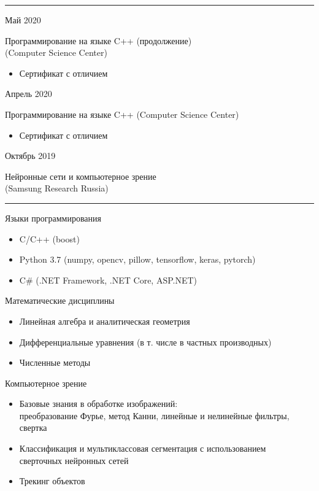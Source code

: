 \documentclass[a4paper,10pt]{article}
\newlength{\cvcolumngapwidth}
\newlength{\cvleftcolumnwidth}
\newlength{\cvrightcolumnwidth}
\newcommand{\cvsectionstyle}[1]{{\normalsize\cvsectionfont\textcolor{cvsectioncolor}{#1}}}
\newcommand{\cvtitlestyle}[1]{{\large\cvtitlefont\textcolor{cvtitlecolor}{#1}}}
\newcommand{\cvdurationstyle}[1]{{\small\cvdurationfont\textcolor{cvdurationcolor}{#1}}}
\newcommand{\cvheadingstyle}[1]{{\normalsize\cvheadingfont\textcolor{cvheadingcolor}{#1}}}
\newlength{\cvafteritemskipamount}
\newlength{\cvaftersectionskipamount}
\newlength{\cvbetweensectionandheadingextraskipamount}
\newlength{\cvaftertitleskipamount}
\newlength{\cvparskip}
\newcommand{\cvsection}[1]{
    \begin{minipage}[t]{\cvleftcolumnwidth}
        \raggedleft\cvsectionstyle{#1}
    \end{minipage}%
    \hspace{\cvcolumngapwidth}%
    \begin{minipage}[t]{\cvrightcolumnwidth}
        \textcolor{cvrulecolor}{\rule{\cvrightcolumnwidth}{0.3mm}}
    \end{minipage}

    \vspace{\cvaftersectionskipamount}
}
\newcommand{\cvitem}[2]{
    \begin{minipage}[t]{\cvleftcolumnwidth}
        \raggedleft #1
    \end{minipage}%
    \hspace{\cvcolumngapwidth}%
    \begin{minipage}[t]{\cvrightcolumnwidth}
        \setlength{\parskip}{\cvparskip} #2
    \end{minipage}

    \vspace{\cvafteritemskipamount}
}
\newcommand{\cvtitle}[1]{
    \cvtitlestyle{#1}

    \vspace{\cvaftertitleskipamount}
    \vspace{-\cvparskip}
}
\begin{document}

\cvsection{Сертификаты}

\cvitem{
    \cvdurationstyle{Май 2020}
}{
    \cvtitle{Программирование на языке C++ (продолжение)\\ (Computer Science Center)}

    \begin{itemize}[leftmargin=*]
        \item Сертификат с отличием
    \end{itemize}
}

\cvitem{
    \cvdurationstyle{Апрель 2020}
}{
    \cvtitle{Программирование на языке C++ (Computer Science Center)}

    \begin{itemize}[leftmargin=*]
        \item Сертификат с отличием
    \end{itemize}
}

\cvitem{
    \cvdurationstyle{Октябрь 2019}
}{
    \cvtitle{Нейронные сети и компьютерное зрение\\ (Samsung Research Russia)}

}


\cvsection{Технические навыки}

\vspace{\cvbetweensectionandheadingextraskipamount}

\cvitem{
    \cvheadingstyle{Языки программирования}
}{
    
    \begin{itemize}
    \item C/C++ (boost)
    \item Python 3.7 (numpy, opencv, pillow, tensorflow, keras, pytorch)
    \item C\# (.NET Framework, .NET Core, ASP.NET)
    \end{itemize}

    
}

\cvitem{
    \cvheadingstyle{Математические дисциплины}
}{
    \begin{itemize}
        \item Линейная алгебра и аналитическая геометрия
        \item Дифференциальные уравнения (в т. числе в частных производных)
        \item Численные методы
    \end{itemize}
}

\cvitem{
    \cvheadingstyle{Компьютерное зрение}
}{
    \begin{itemize}
    \item Базовые знания в обработке изображений: \\
    преобразование Фурье, метод Канни, линейные и нелинейные фильтры, свертка
    \item Классификация и мультиклассовая сегментация с использованием \\ сверточных нейронных сетей
    \item Трекинг объектов
    \end{itemize}
}
\end{document}
